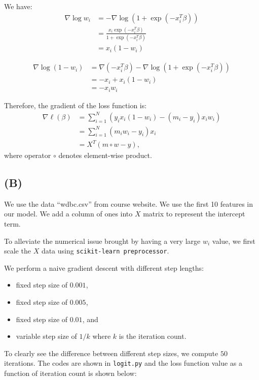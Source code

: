 \documentclass[a4paper,11pt]{article}
\begin{document}
We have:
\begin{align}
\nabla \log w_i& = - \nabla \log (1 + \exp(-x_i^T\beta)	)\\
&= \frac{x_i \exp(-x_i^T\beta)}{1 + \exp(-x_i^T\beta)}\\
& = x_i(1-w_i)
\end{align}

\begin{align}
\nabla \log (1-w_i) & = \nabla (-x_i^T\beta)- \nabla \log (1 + \exp(-x_i^T\beta)	)\\
&= -x_i + x_i (1 - w_i)\\
& = -x_iw_i
\end{align}



Therefore, the gradient of the loss function is:
\begin{align}
		\nabla \ell (\beta) &=\sum_{i=1}^N \left ( y_i x_i (1-w_i) - (m_i - y_i) x_i w_i \right ) \\
		&= \sum_{i=1}^N (m_iw_i-y_i)x_i \\
		&= X^T(m\circ w-y),
	\end{align}
where operator $\circ$ denotes element-wise product.

\subsection{(B)}

We use the data “wdbc.csv” from course website. We use the first 10 features in our model. We add a column of ones into $X$ matrix to represent the intercept term.

To alleviate the numerical issue brought by having a very large $w_i$ value, we first scale the $X$ data using \texttt{scikit-learn preprocessor}. 

We perform a naive gradient descent with different step lengths:
 \begin{itemize}
 	\item fixed step size of $0.001$,
 	\item fixed step size of $0.005$,
 	\item fixed step size of $0.01$, and
 	\item variable step size of $1/k$ where $k$ is the iteration count.
 \end{itemize}

 To clearly see the difference between different step sizes, we compute $50$ iterations. The codes are shown in \texttt{logit.py} and the loss function value as a function of iteration count is shown below:
\end{document}
